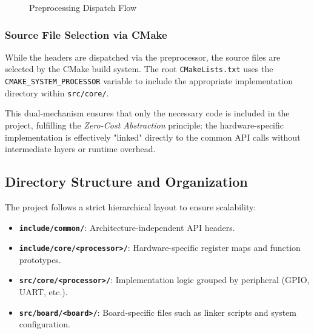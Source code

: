 \begin{figure}[h]
    \centering
    \caption{Preprocessing Dispatch Flow}
    \label{fig:dispatch_flow}
\end{figure}

\subsubsection{Source File Selection via CMake}
While the headers are dispatched via the preprocessor, the source files are selected by the CMake build system. The root \texttt{CMakeLists.txt} uses the \texttt{CMAKE\_SYSTEM\_PROCESSOR} variable to include the appropriate implementation directory within \texttt{src/core/}. 

This dual-mechanism ensures that only the necessary code is included in the project, fulfilling the \textit{Zero-Cost Abstraction} principle: the hardware-specific implementation is effectively "linked" directly to the common API calls without intermediate layers or runtime overhead.

\subsection{Directory Structure and Organization}
The project follows a strict hierarchical layout to ensure scalability:
\begin{itemize}
    \item \textbf{\texttt{include/common/}}: Architecture-independent API headers.
    \item \textbf{\texttt{include/core/<processor>/}}: Hardware-specific register maps and function prototypes.
    \item \textbf{\texttt{src/core/<processor>/}}: Implementation logic grouped by peripheral (GPIO, UART, etc.).
    \item \textbf{\texttt{src/board/<board>/}}: Board-specific files such as linker scripts and system configuration.
\end{itemize}

